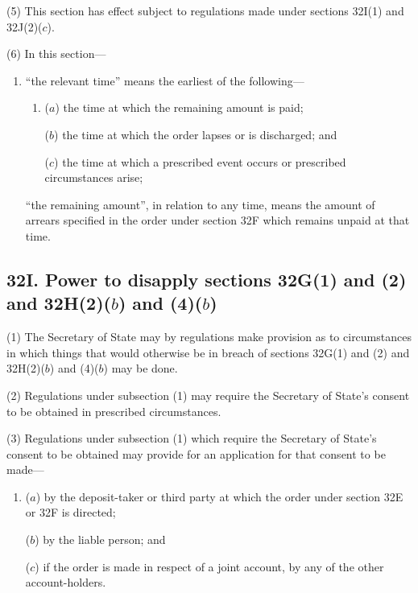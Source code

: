 \documentclass[a4paper]{article}
\begin{document}
(5) This section has effect subject to regulations made under sections 32I(1) and
32J(2)($c$).

(6) In this section---
\begin{enumerate}\item[]
“the relevant time” means the earliest of the following---
\begin{enumerate}\item[]
($a$) the time at which the remaining amount is paid;

($b$) the time at which the order lapses or is discharged; and

($c$) the time at which a prescribed event occurs or prescribed circumstances
arise;
\end{enumerate}

“the remaining amount”, in relation to any time, means the amount of arrears
specified in the order under section 32F which remains unpaid at that time.
\end{enumerate}


\subsection{\sloppy 32I. Power to disapply sections 32G(1) and (2) and 32H(2)($b$) and (4)($b$)}

(1) The Secretary of State may by regulations make provision as to
circumstances in which things that would otherwise be in breach of sections 32G(1) and (2) and 32H(2)($b$) and (4)($b$) may be done.

(2) Regulations under subsection (1) may require the Secretary of State’s consent
to be obtained in prescribed circumstances.

(3) Regulations under subsection (1) which require the Secretary of State’s consent
to be obtained may provide for an application for that consent to be made---
\begin{enumerate}\item[]
($a$) by the deposit-taker or third party at which the order under section 32E or
32F is directed;

($b$) by the liable person; and

($c$) if the order is made in respect of a joint account, by any of the other account-holders.
\end{enumerate}
\end{document}
